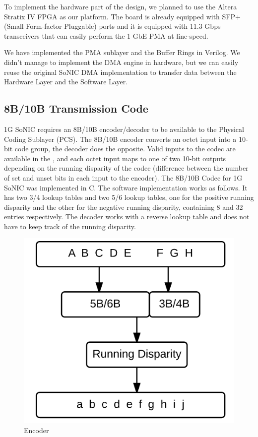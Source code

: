 \documentclass[conference]{IEEEtran}
\begin{document}
To implement the hardware part of the design, we planned to use the Altera Stratix IV FPGA as our platform. The board is already equipped with SFP+ (Small Form-factor Pluggable) ports and it is equipped with 11.3 Gbps transceivers that can easily perform the 1 GbE PMA at line-speed.

We have implemented the PMA sublayer and the Buffer Rings in Verilog. We didn't manage to implement the DMA engine in hardware, but we can easily reuse the original SoNIC DMA implementation to transfer data between the Hardware Layer and the Software Layer.

\subsection{8B/10B Transmission Code}

1G SoNIC requires an 8B/10B encoder/decoder to be available to the Physical Coding Sublayer (PCS). The 8B/10B encoder converts an octet input into a 10-bit code group, the decoder does the opposite. Valid inputs to the codec are available in the \cite{ieeestandard}, and each octet input maps to one of two 10-bit outputs depending on the running disparity of the codec (difference between the number of set and unset bits in each input to the encoder). The 8B/10B Codec for 1G SoNIC was implemented in C. The software implementation works as follows. It has two 3/4 lookup tables and two 5/6 lookup tables, one for the positive running disparity and the other for the negative running disparity, containing 8 and 32 entries respectively. The decoder works with a reverse lookup table and does not have to keep track of the running disparity.

\begin{figure}[h]
  \centering
  \includegraphics[scale=0.3]{images/encoder}
  \caption{Encoder}
  \label{fig:encoder}
\end{figure}
\end{document}
